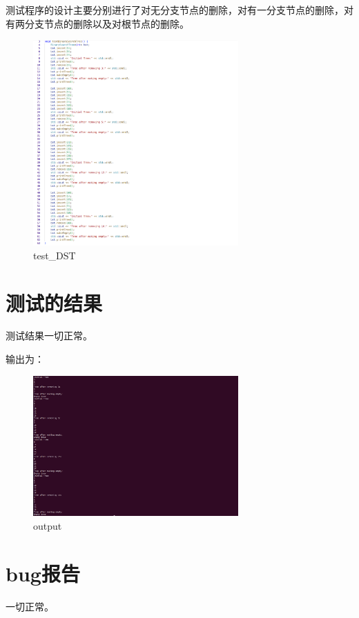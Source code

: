 \documentclass[UTF8]{ctexart}
\begin{document}
	
	
	测试程序的设计主要分别进行了对无分支节点的删除，对有一分支节点的删除，对有两分支节点的删除以及对根节点的删除。

		\begin{figure}[H] %
			\centering %
			\includegraphics[width=0.7\textwidth]{fig3} %
			\caption{test\_DST} %
		\end{figure}
		
	\section{测试的结果}
	
	测试结果一切正常。
	
	输出为： 
		
		\begin{figure}[H] %
			\centering %
			\includegraphics[width=0.7\textwidth]{fig4} %
			\caption{output} %
			\label{Fig.main2} %
		\end{figure}
		
	
	\section{bug报告}
	
	一切正常。
	
\end{document}
